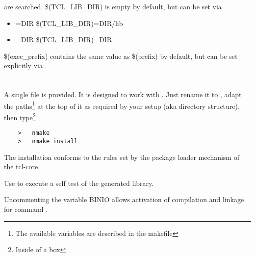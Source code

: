 \documentclass {report}
\begin{document}
\begin {itemize}
	are searched. \$(TCL\_LIB\_DIR) is empty by default, but
	can be set via

	\begin {itemize}
	\item[]	=DIR	      \ra {} \$(TCL\_LIB\_DIR)=DIR/lib
	\item[]	=DIR \ra {} \$(TCL\_LIB\_DIR)=DIR
	\end {itemize}

	\$(exec\_prefix) contains the same value as \$(prefix) by
	default, but can be set explicitly via .
\end {itemize}



\section {\win{}}

A single file  is provided. It is designed to
work with . Just rename it to , adapt
the paths\footnote {The available variables are described in the
makefile} at the top of it as required by your setup (aka directory
structure), then type\footnote {Inside of a \dos {} box}

\begin{verbatim}
	>	nmake
	>	nmake install
\end{verbatim}


The installation conforms to the rules set by the package loader
mechanism of the tcl-core.

Use  to execute a self test of the generated library.

Uncommenting the variable BINIO allows activation of compilation and
linkage for command .
\end{document}

